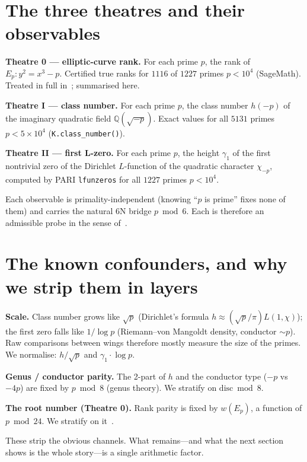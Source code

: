 \documentclass[11pt]{article}
\newcommand{\chip}{\chi_{-p}}
\begin{document}
\section{The three theatres and their observables}
\textbf{Theatre 0 --- elliptic-curve rank.} For each prime $p$, the rank of $E_p : y^2 = x^3 - p$.
Certified true ranks for $1116$ of $1227$ primes $p<10^4$ (SageMath). Treated in full in~\cite{chen-crt};
summarised here.

\noindent\textbf{Theatre I --- class number.} For each prime $p$, the class number $h(-p)$ of the
imaginary quadratic field $\mathbb{Q}(\sqrt{-p})$. Exact values for all $5131$ primes $p<5\times10^4$
(\texttt{K.class\_number()}).

\noindent\textbf{Theatre II --- first L-zero.} For each prime $p$, the height $\gamma_1$ of the first
nontrivial zero of the Dirichlet $L$-function of the quadratic character $\chip$, computed by PARI
\texttt{lfunzeros} for all $1227$ primes $p<10^4$.

Each observable is primality-independent (knowing ``$p$ is prime'' fixes none of them) and carries
the natural 6N bridge $p\bmod 6$. Each is therefore an admissible probe in the sense of~\cite{chen-crt}.

\section{The known confounders, and why we strip them in layers}
\textbf{Scale.} Class number grows like $\sqrt{p}$ (Dirichlet's formula $h \approx (\sqrt{p}/\pi)L(1,\chi)$);
the first zero falls like $1/\log p$ (Riemann--von Mangoldt density, conductor $\sim p$). Raw
comparisons between wings therefore mostly measure the size of the primes. We normalise: $h/\sqrt{p}$
and $\gamma_1\cdot\log p$.

\noindent\textbf{Genus / conductor parity.} The 2-part of $h$ and the conductor type ($-p$ vs $-4p$)
are fixed by $p\bmod 8$ (genus theory). We stratify on $\mathrm{disc}\bmod 8$.

\noindent\textbf{The root number (Theatre 0).} Rank parity is fixed by $w(E_p)$, a function of
$p\bmod 24$. We stratify on it~\cite{chen-crt}.

These strip the obvious channels. What remains---and what the next section shows is the whole
story---is a single arithmetic factor.
\end{document}
